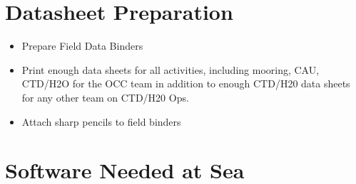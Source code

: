 \documentclass[]{book}
\providecommand{\tightlist}{%
  \setlength{\itemsep}{0pt}\setlength{\parskip}{0pt}}
\begin{document}
\section{Datasheet Preparation}\label{datasheet-preparation}

\begin{itemize}
\tightlist
\item
  Prepare Field Data Binders
\item
  Print enough data sheets for all activities, including mooring, CAU,
  CTD/H2O for the OCC team in addition to enough CTD/H20 data sheets for
  any other team on CTD/H20 Ops.
\item
  Attach sharp pencils to field binders
\end{itemize}

\section{Software Needed at Sea}\label{software-needed-at-sea}
\end{document}
